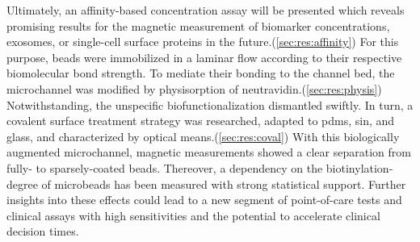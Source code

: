 Ultimately, an affinity-based concentration assay will be presented which reveals promising results for the magnetic measurement of biomarker concentrations, exosomes, or single-cell surface proteins in the future.(\cref{sec:res:affinity}) For this purpose, beads were immobilized in a laminar flow according to their respective biomolecular bond strength. To mediate their bonding to the channel bed, the microchannel was modified by physisorption of neutravidin.(\cref{sec:res:physis}) Notwithstanding, the unspecific biofunctionalization dismantled swiftly. In turn, a covalent surface treatment strategy was researched, adapted to \acrshort{pdms}, \acrshort{sin}, and glass, and characterized by optical means.(\cref{sec:res:coval}) With this biologically augmented microchannel, magnetic measurements showed a clear separation from fully- to sparsely-coated beads. Thereover, a dependency on the biotinylation-degree of microbeads has been measured with strong statistical support. Further insights into these effects could lead to a new segment of point-of-care tests and clinical assays with high sensitivities and the potential to accelerate clinical decision times.


